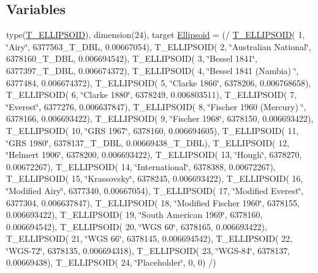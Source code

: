 \subsection*{Variables}
\begin{DoxyCompactItemize}
\item 
type(\hyperlink{typenetcdf__support_1_1_t___e_l_l_i_p_s_o_i_d}{T\_\-ELLIPSOID}), dimension(24), target \hyperlink{namespacenetcdf__support_ad7768781e3e21a9e3d534c4f2c551a8f}{Ellipsoid} = (/ \hyperlink{typenetcdf__support_1_1_t___e_l_l_i_p_s_o_i_d}{T\_\-ELLIPSOID}( 1, \char`\"{}Airy\char`\"{}, 6377563\_\-T\_\-DBL, 0.00667054), T\_\-ELLIPSOID( 2, \char`\"{}Australian National\char`\"{}, 6378160\_\-T\_\-DBL, 0.006694542), T\_\-ELLIPSOID( 3, \char`\"{}Bessel 1841\char`\"{}, 6377397\_\-T\_\-DBL, 0.006674372), T\_\-ELLIPSOID( 4, \char`\"{}Bessel 1841 (Nambia) \char`\"{}, 6377484, 0.006674372), T\_\-ELLIPSOID( 5, \char`\"{}Clarke 1866\char`\"{}, 6378206, 0.006768658), T\_\-ELLIPSOID( 6, \char`\"{}Clarke 1880\char`\"{}, 6378249, 0.006803511), T\_\-ELLIPSOID( 7, \char`\"{}Everest\char`\"{}, 6377276, 0.006637847), T\_\-ELLIPSOID( 8, \char`\"{}Fischer 1960 (Mercury) \char`\"{}, 6378166, 0.006693422), T\_\-ELLIPSOID( 9, \char`\"{}Fischer 1968\char`\"{}, 6378150, 0.006693422), T\_\-ELLIPSOID( 10, \char`\"{}GRS 1967\char`\"{}, 6378160, 0.006694605), T\_\-ELLIPSOID( 11, \char`\"{}GRS 1980\char`\"{}, 6378137\_\-T\_\-DBL, 0.00669438\_\-T\_\-DBL), T\_\-ELLIPSOID( 12, \char`\"{}Helmert 1906\char`\"{}, 6378200, 0.006693422), T\_\-ELLIPSOID( 13, \char`\"{}Hough\char`\"{}, 6378270, 0.00672267), T\_\-ELLIPSOID( 14, \char`\"{}International\char`\"{}, 6378388, 0.00672267), T\_\-ELLIPSOID( 15, \char`\"{}Krassovsky\char`\"{}, 6378245, 0.006693422), T\_\-ELLIPSOID( 16, \char`\"{}Modified Airy\char`\"{}, 6377340, 0.00667054), T\_\-ELLIPSOID( 17, \char`\"{}Modified Everest\char`\"{}, 6377304, 0.006637847), T\_\-ELLIPSOID( 18, \char`\"{}Modified Fischer 1960\char`\"{}, 6378155, 0.006693422), T\_\-ELLIPSOID( 19, \char`\"{}South American 1969\char`\"{}, 6378160, 0.006694542), T\_\-ELLIPSOID( 20, \char`\"{}WGS 60\char`\"{}, 6378165, 0.006693422), T\_\-ELLIPSOID( 21, \char`\"{}WGS 66\char`\"{}, 6378145, 0.006694542), T\_\-ELLIPSOID( 22, \char`\"{}WGS-\/72\char`\"{}, 6378135, 0.006694318), T\_\-ELLIPSOID( 23, \char`\"{}WGS-\/84\char`\"{}, 6378137, 0.00669438), T\_\-ELLIPSOID( 24, \char`\"{}Placeholder\char`\"{}, 0, 0) /)
\end{DoxyCompactItemize}


